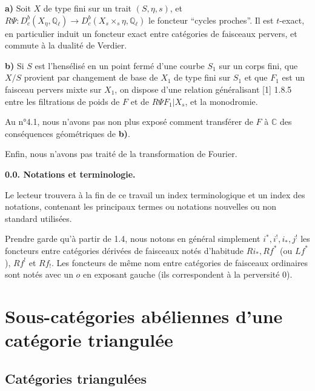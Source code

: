 \documentclass[12pt,a4paper]{article}
\theoremstyle{plain}
\theoremstyle{definition}
\theoremstyle{remark}
\newcommand{\CC}{\mathbb{C}}
\newcommand{\QQ}{\mathbb{Q}}
\begin{document}
\medskip

\noindent
\textbf{a)} Soit $X$ de type fini sur un trait $(S, \eta, s)$, et $R\Psi : D^{b}_{c}(X_{\eta}, \QQ_{\ell}) \longrightarrow D^{b}_{c}(X_{s} \times_{s} \eta, \QQ_{\ell})$ le foncteur ``cycles proches''. Il est $t$-exact, en particulier induit un foncteur exact entre catégories de faisceaux pervers, et commute à la dualité de Verdier.

\smallskip

\noindent
\textbf{b)} Si $S$ est l'hensélisé en un point fermé d'une courbe $S_{1}$ sur un corps fini, que $X/S$ provient par changement de base de $X_{1}$ de type fini sur $S_{1}$ et que $F_{1}$ est un faisceau pervers mixte sur $X_{1}$, on dispose d'une relation généralisant [1] 1.8.5 entre les filtrations de poids de $F$ et de $R\Psi F_{1}|X_{s}$, et la monodromie.

Au n°4.1, nous n'avons pas non plus exposé comment transférer de $F$ à $\CC$ des conséquences géométriques de \textbf{b)}.

Enfin, nous n'avons pas traité de la transformation de Fourier.

\medskip

\noindent
\textbf{0.0. Notations et terminologie.}

Le lecteur trouvera à la fin de ce travail un index terminologique et un index des notations, contenant les principaux termes ou notations nouvelles ou non standard utilisées.

Prendre garde qu'à partir de 1.4, nous notons en général simplement $i^{*}, i^{!}, i_{*}, j^{!}$ les foncteurs entre catégories dérivées de faisceaux notés d'habitude $Ri_{*}, Rf^{*}$ (ou $Lf^{*}$), $Rf^{!}$ et $Rf_{!}$. Les foncteurs de même nom entre catégories de faisceaux ordinaires sont notés avec un $o$ en exposant gauche (ils correspondent à la perversité $0$).

\newpage

\section{Sous-catégories abéliennes d'une catégorie triangulée}

\subsection{Catégories triangulées}
\end{document}
